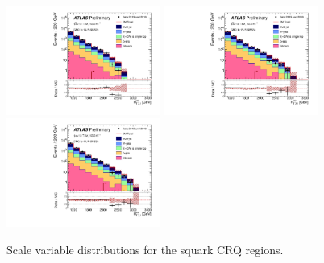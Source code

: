 \begin{figure}[tbp]
\begin{center}
\includegraphics[width=0.45\textwidth]{figures/ATLAS-CONF-2016-078_INT/N-1Plots/AtlasStyle/Preliminary/CRQ_SRJigsawSRS2b_LastCut_CRQ_minusone}
\includegraphics[width=0.45\textwidth]{figures/ATLAS-CONF-2016-078_INT/N-1Plots/AtlasStyle/Preliminary/CRQ_SRJigsawSRS3a_LastCut_CRQ_minusone}
\includegraphics[width=0.45\textwidth]{figures/ATLAS-CONF-2016-078_INT/N-1Plots/AtlasStyle/Preliminary/CRQ_SRJigsawSRS3b_LastCut_CRQ_minusone}
\end{center}
\caption{Scale variable distributions for the squark CRQ regions.}
\label{fig:CRQ_SRJigsawSRS1a_LastCut_CRQ_minusone}
\end{figure}
